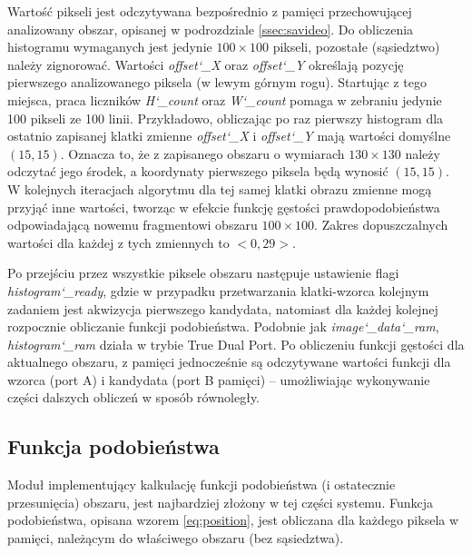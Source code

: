 Wartość pikseli jest odczytywana bezpośrednio z pamięci przechowującej analizowany obszar, opisanej w podrozdziale \ref{ssec:savideo}. 
Do obliczenia histogramu wymaganych jest jedynie $100\times 100$ pikseli, pozostałe (sąsiedztwo) należy zignorować. %
Wartości \textit{offset\char`_X} oraz \textit{offset\char`_Y} określają pozycję pierwszego analizowanego piksela (w lewym górnym rogu). Startując z tego miejsca, praca liczników \textit{H\char`_count} oraz \textit{W\char`_count} pomaga w zebraniu jedynie 100 pikseli ze 100 linii. %
Przykładowo, obliczając po raz pierwszy histogram dla ostatnio zapisanej klatki zmienne \textit{offset\char`_X} i \textit{offset\char`_Y} mają wartości domyślne $(15,15)$. 
Oznacza to, że z zapisanego obszaru o wymiarach $130\times 130$ należy odczytać jego środek, a koordynaty pierwszego piksela będą wynosić $(15,15)$. W kolejnych iteracjach algorytmu dla tej samej klatki obrazu zmienne mogą przyjąć inne wartości, tworząc w efekcie funkcję gęstości prawdopodobieństwa odpowiadającą nowemu fragmentowi obszaru $100\times 100$. %
Zakres dopuszczalnych wartości dla każdej z tych zmiennych to $<0,29>$. 

Po przejściu przez wszystkie piksele obszaru następuje ustawienie flagi \textit{histogram\char`_ready}, gdzie w przypadku przetwarzania klatki-wzorca kolejnym zadaniem jest akwizycja pierwszego kandydata, natomiast dla każdej kolejnej rozpocznie obliczanie funkcji podobieństwa.
Podobnie jak \textit{image\char`_data\char`_ram}, \textit{histogram\char`_ram} działa w trybie True Dual Port. %
Po obliczeniu funkcji gęstości dla aktualnego obszaru, z pamięci jednocześnie są odczytywane wartości funkcji dla wzorca (port A) i kandydata (port B pamięci) -- umożliwiając wykonywanie części dalszych obliczeń w sposób równoległy. %


\subsection{Funkcja podobieństwa}

Moduł implementujący kalkulację funkcji podobieństwa (i ostatecznie przesunięcia) obszaru, jest najbardziej złożony w tej części systemu. 
Funkcja podobieństwa, opisana wzorem \eqref{eq:position}, jest obliczana dla każdego piksela w pamięci, należącym do właściwego obszaru (bez sąsiedztwa). %

